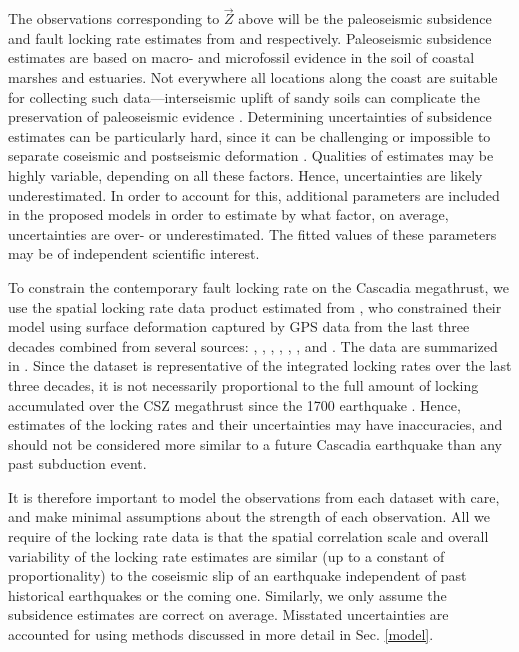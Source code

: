 {The observations corresponding to $\vec{Z}$ above will be the paleoseismic subsidence and fault locking rate estimates from \citet{leonard2010} and \citet{evans2015} respectively.  Paleoseismic subsidence estimates are based on macro- and microfossil evidence in the soil of coastal marshes and estuaries.  Not everywhere all locations along the coast are suitable for collecting such data---interseismic uplift of sandy soils can complicate the preservation of paleoseismic evidence \citep{leonard2010}.  Determining uncertainties of subsidence estimates can be particularly hard, since it can be challenging or impossible to separate coseismic and postseismic deformation \citep{wang2012, wang2013}.  Qualities of estimates may be highly variable, depending on all these factors.  Hence, uncertainties are likely underestimated.  In order to account for this, additional parameters are included in the proposed models in order to estimate by what factor, on average, uncertainties are over- or underestimated.  The fitted values of these parameters may be of independent scientific interest.

To constrain the contemporary fault locking rate on the Cascadia megathrust, we use the spatial locking rate data product estimated from \citep{pollitz2017}, who constrained their model using surface deformation captured by GPS data from the last three decades combined from several sources: \citet{GPS1}, \citet{GPS2}, \citet{GPS3}, \citet{GPS4}, \citet{GPS5}, \citet{GPS6}, and \citet{GPS7}.  The data are summarized in \citet{evans2015}.  Since the dataset is representative of the integrated locking rates over the last three decades, it is not necessarily proportional to the full amount of locking accumulated over the CSZ megathrust since the 1700 earthquake \citep{wang2012}.  Hence, estimates of the locking rates and their uncertainties may have inaccuracies, and should not be considered more similar to a future Cascadia earthquake than any past subduction event.

It is therefore important to model the observations from each dataset with care, and make minimal assumptions about the strength of each observation.  All we require of the locking rate data is that the spatial correlation scale and overall variability of the locking rate estimates are similar (up to a constant of proportionality) to the coseismic slip of an earthquake independent of past historical earthquakes or the coming one.   Similarly, we only assume the subsidence estimates are correct on average.  Misstated uncertainties are accounted for using methods discussed in more detail in Sec. \ref{model}.

}
